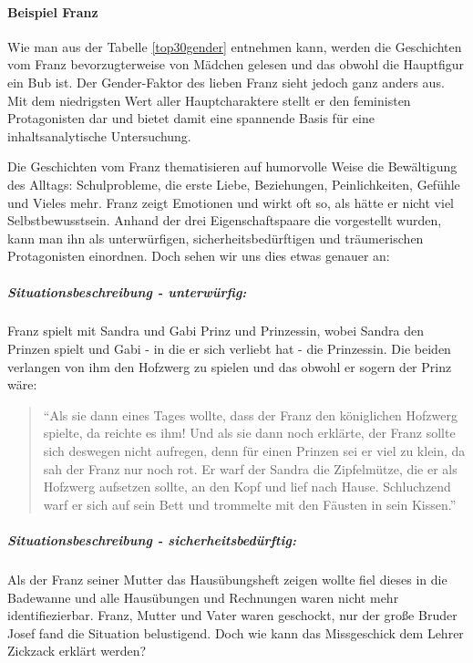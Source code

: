 \paragraph{Beispiel Franz}

Wie man aus der Tabelle \ref{top30gender} entnehmen kann, werden die
Geschichten vom Franz bevorzugterweise von Mädchen gelesen und das
obwohl die Hauptfigur ein Bub ist. Der Gender-Faktor des lieben Franz
sieht jedoch ganz anders aus. Mit dem niedrigsten Wert aller
Hauptcharaktere stellt er den feministen Protagonisten dar und bietet
damit eine spannende Basis für eine inhaltsanalytische Untersuchung.

Die Geschichten vom Franz thematisieren auf humorvolle Weise die
Bewältigung des Alltags: Schulprobleme, die erste Liebe, Beziehungen,
Peinlichkeiten, Gefühle und Vieles mehr. Franz zeigt Emotionen und wirkt
oft so, als hätte er nicht viel Selbstbewusstsein. Anhand der drei
Eigenschaftspaare die vorgestellt wurden, kann man ihn als
unterwürfigen, sicherheitsbedürftigen und träumerischen Protagonisten
einordnen. Doch sehen wir uns dies etwas genauer an:

\subparagraph{Situationsbeschreibung - unterwürfig:}

Franz spielt mit Sandra und Gabi Prinz und Prinzessin, wobei Sandra den
Prinzen spielt und Gabi - in die er sich verliebt hat - die Prinzessin.
Die beiden verlangen von ihm den Hofzwerg zu spielen und das obwohl er
sogern der Prinz wäre:

\begin{quote}
``Als sie dann eines Tages wollte, dass der Franz den königlichen
Hofzwerg spielte, da reichte es ihm! Und als sie dann noch erklärte, der
Franz sollte sich deswegen nicht aufregen, denn für einen Prinzen sei er
viel zu klein, da sah der Franz nur noch rot. Er warf der Sandra die
Zipfelmütze, die er als Hofzwerg aufsetzen sollte, an den Kopf und lief
nach Hause. Schluchzend warf er sich auf sein Bett und trommelte mit den
Fäusten in sein Kissen.'' \parencite[][30]{Noestlinger2010}
\end{quote}

\subparagraph{Situationsbeschreibung - sicherheitsbedürftig:}

Als der Franz seiner Mutter das Hausübungsheft zeigen wollte fiel dieses
in die Badewanne und alle Hausübungen und Rechnungen waren nicht mehr
identifiezierbar. Franz, Mutter und Vater waren geschockt, nur der große
Bruder Josef fand die Situation belustigend. Doch wie kann das
Missgeschick dem Lehrer Zickzack erklärt werden?


